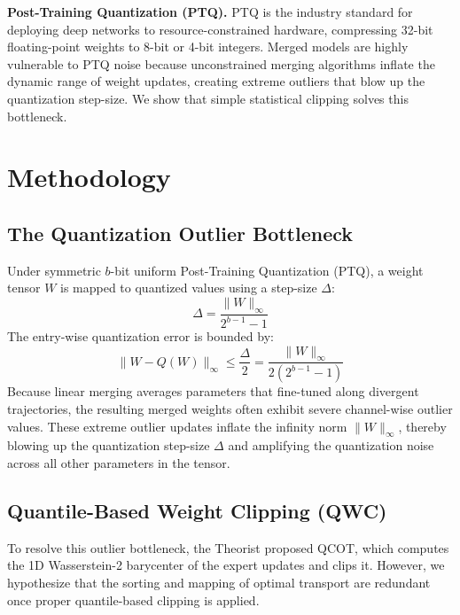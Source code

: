 \documentclass{article}
\theoremstyle{plain}
\theoremstyle{definition}
\theoremstyle{remark}
\begin{document}
\textbf{Post-Training Quantization (PTQ).} PTQ is the industry standard for deploying deep networks to resource-constrained hardware, compressing 32-bit floating-point weights to 8-bit or 4-bit integers. Merged models are highly vulnerable to PTQ noise because unconstrained merging algorithms inflate the dynamic range of weight updates, creating extreme outliers that blow up the quantization step-size. We show that simple statistical clipping solves this bottleneck.

\section{Methodology}
\subsection{The Quantization Outlier Bottleneck}
Under symmetric $b$-bit uniform Post-Training Quantization (PTQ), a weight tensor $W$ is mapped to quantized values using a step-size $\Delta$:
\begin{equation}
\Delta = \frac{\|W\|_\infty}{2^{b-1} - 1}
\end{equation}
The entry-wise quantization error is bounded by:
\begin{equation}
\|W - Q(W)\|_\infty \le \frac{\Delta}{2} = \frac{\|W\|_\infty}{2(2^{b-1} - 1)}
\end{equation}
Because linear merging averages parameters that fine-tuned along divergent trajectories, the resulting merged weights often exhibit severe channel-wise outlier values. These extreme outlier updates inflate the infinity norm $\|W\|_\infty$, thereby blowing up the quantization step-size $\Delta$ and amplifying the quantization noise across all other parameters in the tensor.

\subsection{Quantile-Based Weight Clipping (QWC)}
To resolve this outlier bottleneck, the Theorist \cite{paper9} proposed QCOT, which computes the 1D Wasserstein-2 barycenter of the expert updates and clips it. However, we hypothesize that the sorting and mapping of optimal transport are redundant once proper quantile-based clipping is applied.
\end{document}
